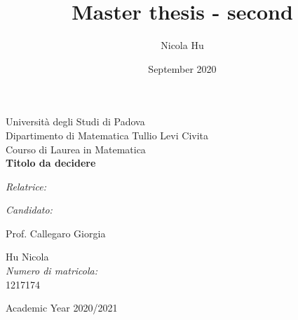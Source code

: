 \documentclass[a4paper,italian,11pt]{book}
\title{Master thesis - second}
\author{Nicola Hu}
\date{September 2020}
\newcommand{\facciatabianca}{\newpage\shipout\null\stepcounter{page}}
\theoremstyle{plain}
\theoremstyle{remark}
\theoremstyle{plain}
\begin{document}
\begin{titlepage}
\begin{figure} [h]
\begin{center}
\end{center}
\end{figure}
\begin{center}
{\Large Universit\`a degli Studi di Padova\\}
\vspace{8mm} 
{\Large Dipartimento di Matematica Tullio Levi Civita\\}
\vspace{8mm}
{\Large Courso di Laurea in Matematica\\}
\vspace{10mm}
{\LARGE \textbf{Titolo da decidere}\\}	

\vspace{30mm}
\end{center}
\par
\begin{minipage}[t]{0.5\textwidth}
{\Large \textit{Relatrice:}}
\end{minipage}
\hfill
\begin{minipage}[t]{0.5\textwidth} \raggedleft
{\Large \textit{Candidato: }}
\end{minipage}
\par
\vspace{1mm}
\begin{minipage}[t]{0.5\textwidth}
{\Large Prof. Callegaro Giorgia}
\end{minipage}
\hfill
\begin{minipage}[t]{0.5\textwidth} \raggedleft
{\Large Hu Nicola \\ \textit{Numero di matricola:} \\ 1217174\\}%
\end{minipage}
\vspace{25mm}
\begin{center}
{\large{
Academic Year 2020/2021}}
\end{center}
\end{titlepage}



\facciatabianca




\newpage
\tableofcontents
\pagestyle{headings}
\end{document}
